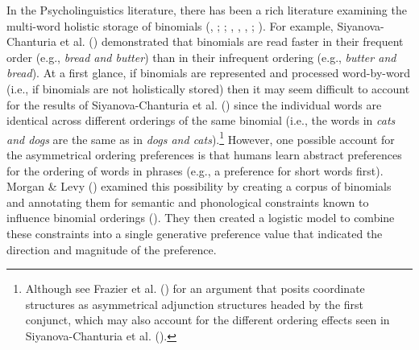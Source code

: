 \documentclass[
  12pt,
]{scrartcl}
\begin{document}
In the Psycholinguistics literature, there has been a rich literature
examining the multi-word holistic storage of binomials
(,
;
; , ,
,
;
). For example, Siyanova-Chanturia et al.
()
demonstrated that binomials are read faster in their frequent order
(e.g., \emph{bread and butter}) than in their infrequent ordering (e.g.,
\emph{butter and bread}). At a first glance, if binomials are
represented and processed word-by-word (i.e., if binomials are not
holistically stored) then it may seem difficult to account for the
results of Siyanova-Chanturia et al.
() since the
individual words are identical across different orderings of the same
binomial (i.e., the words in \emph{cats and dogs} are the same as in
\emph{dogs and cats}).\footnote{Although see Frazier et al.
  () for
  an argument that posits coordinate structures as asymmetrical
  adjunction structures headed by the first conjunct, which may also
  account for the different ordering effects seen in Siyanova-Chanturia
  et al. ().}
However, one possible account for the asymmetrical ordering preferences
is that humans learn abstract preferences for the ordering of words in
phrases (e.g., a preference for short words first). Morgan \& Levy
() examined this
possibility by creating a corpus of binomials and annotating them for
semantic and phonological constraints known to influence binomial
orderings (). They then created a logistic model to combine these
constraints into a single generative preference value that indicated the
direction and magnitude of the preference.
\end{document}
